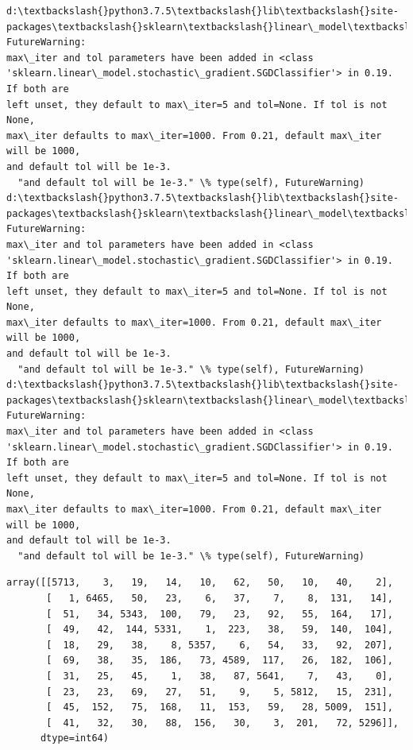 \documentclass[11pt]{article}
\makeatletter
\newcommand{\boxspacing}{\kern\kvtcb@left@rule\kern\kvtcb@boxsep}
\newcommand{\prompt}[4]{
        \ttfamily\llap{{\color{#2}[#3]:\hspace{3pt}#4}}\vspace{-\baselineskip}
    }
\makeatother
\begin{document}
    \begin{Verbatim}[commandchars=\\\{\}]
d:\textbackslash{}python3.7.5\textbackslash{}lib\textbackslash{}site-
packages\textbackslash{}sklearn\textbackslash{}linear\_model\textbackslash{}stochastic\_gradient.py:128: FutureWarning:
max\_iter and tol parameters have been added in <class
'sklearn.linear\_model.stochastic\_gradient.SGDClassifier'> in 0.19. If both are
left unset, they default to max\_iter=5 and tol=None. If tol is not None,
max\_iter defaults to max\_iter=1000. From 0.21, default max\_iter will be 1000,
and default tol will be 1e-3.
  "and default tol will be 1e-3." \% type(self), FutureWarning)
d:\textbackslash{}python3.7.5\textbackslash{}lib\textbackslash{}site-
packages\textbackslash{}sklearn\textbackslash{}linear\_model\textbackslash{}stochastic\_gradient.py:128: FutureWarning:
max\_iter and tol parameters have been added in <class
'sklearn.linear\_model.stochastic\_gradient.SGDClassifier'> in 0.19. If both are
left unset, they default to max\_iter=5 and tol=None. If tol is not None,
max\_iter defaults to max\_iter=1000. From 0.21, default max\_iter will be 1000,
and default tol will be 1e-3.
  "and default tol will be 1e-3." \% type(self), FutureWarning)
d:\textbackslash{}python3.7.5\textbackslash{}lib\textbackslash{}site-
packages\textbackslash{}sklearn\textbackslash{}linear\_model\textbackslash{}stochastic\_gradient.py:128: FutureWarning:
max\_iter and tol parameters have been added in <class
'sklearn.linear\_model.stochastic\_gradient.SGDClassifier'> in 0.19. If both are
left unset, they default to max\_iter=5 and tol=None. If tol is not None,
max\_iter defaults to max\_iter=1000. From 0.21, default max\_iter will be 1000,
and default tol will be 1e-3.
  "and default tol will be 1e-3." \% type(self), FutureWarning)
    \end{Verbatim}

            \begin{tcolorbox}[breakable, size=fbox, boxrule=.5pt, pad at break*=1mm, opacityfill=0]
\prompt{Out}{outcolor}{63}{\boxspacing}
\begin{Verbatim}[commandchars=\\\{\}]
array([[5713,    3,   19,   14,   10,   62,   50,   10,   40,    2],
       [   1, 6465,   50,   23,    6,   37,    7,    8,  131,   14],
       [  51,   34, 5343,  100,   79,   23,   92,   55,  164,   17],
       [  49,   42,  144, 5331,    1,  223,   38,   59,  140,  104],
       [  18,   29,   38,    8, 5357,    6,   54,   33,   92,  207],
       [  69,   38,   35,  186,   73, 4589,  117,   26,  182,  106],
       [  31,   25,   45,    1,   38,   87, 5641,    7,   43,    0],
       [  23,   23,   69,   27,   51,    9,    5, 5812,   15,  231],
       [  45,  152,   75,  168,   11,  153,   59,   28, 5009,  151],
       [  41,   32,   30,   88,  156,   30,    3,  201,   72, 5296]],
      dtype=int64)
\end{Verbatim}
\end{tcolorbox}
        
\end{document}
